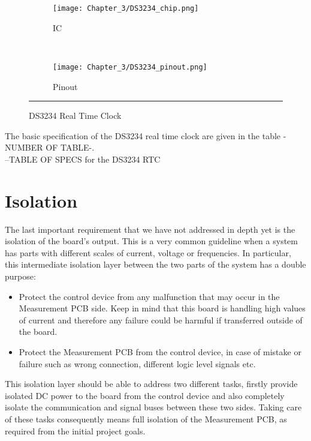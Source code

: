\begin{figure}[htbp]
	\centering
	\begin{subfigure}[b]{.4\textwidth}
		\texttt{[image: Chapter\_3/DS3234\_chip.png]}
	    \caption[]{IC}
	    \label{fig:DS3234_chip}
	\end{subfigure}
    ~
	\begin{subfigure}[b]{.4\textwidth}
		\texttt{[image: Chapter\_3/DS3234\_pinout.png]}
	    \caption[]{Pinout}
	    \label{fig:DS3234_pinout}
	\end{subfigure}
	\rule{35em}{0.5pt}
	\caption{DS3234 Real Time Clock}
	\label{fig:DS3234}
\end{figure}

The basic specification of the DS3234 real time clock are given in the table -NUMBER OF TABLE-.\\

--TABLE OF SPECS for the DS3234 RTC\\

\section{Isolation}
The last important requirement that we have not addressed in depth yet is the isolation of the board's output. This is a very common guideline when a system has parts with different scales of current, voltage or frequencies. In particular, this intermediate isolation layer between the two parts of the system has a double purpose:

\begin{itemize}
    \item Protect the control device from any malfunction that may occur in the Measurement PCB side. Keep in mind that this board is handling high values of current and therefore any failure could be harmful if transferred outside of the board.
    \item Protect the Measurement PCB from the control device, in case of mistake or failure such as wrong connection, different logic level signals etc.
\end{itemize}

This isolation layer should be able to address two different tasks, firstly provide isolated DC power to the board from the control device and also completely isolate the communication and signal buses between these two sides. Taking care of these tasks consequently means full isolation of the Measurement PCB, as required from the initial project goals.

